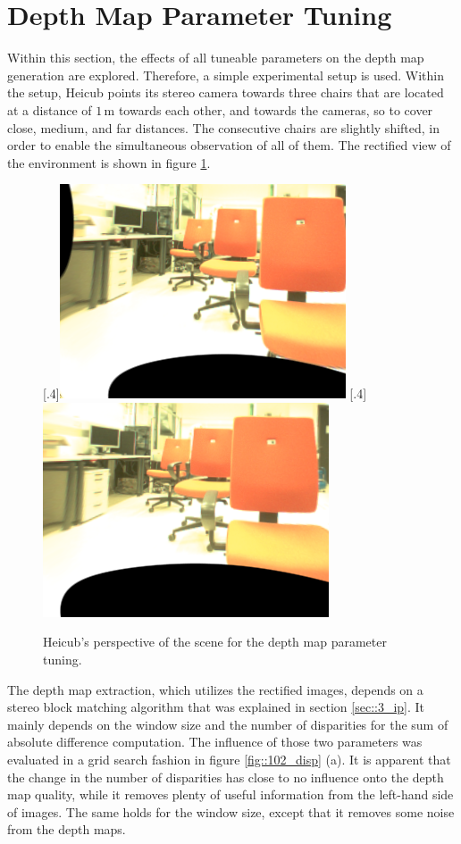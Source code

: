 \section{Depth Map Parameter Tuning}
\label{sec::102_dp}
Within this section, the effects of all tuneable parameters on the depth map generation are explored. Therefore, a simple experimental setup is used. Within the setup, Heicub points its stereo camera towards three chairs that are located at a distance of $1\,\text{m}$ towards each other, and towards the cameras, so to cover close, medium, and far distances. The consecutive chairs are slightly shifted, in order to enable the simultaneous observation of all of them. The rectified view of the environment is shown in figure \ref{fig::102_wls_rgb}.
\begin{figure}[h!]
	\centering
	[.4\linewidth]{\includegraphics[scale=.3]{chapters/10_image_processing_experiments/img/l_rgb.png}}
	[.4\linewidth]{\includegraphics[scale=.3]{chapters/10_image_processing_experiments/img/r_rgb.png}}
	\caption{Heicub's perspective of the scene for the depth map parameter tuning.}
	\label{fig::102_wls_rgb}
\end{figure}
The depth map extraction, which utilizes the rectified images, depends on a stereo block matching algorithm that was explained in section \ref{sec::3_ip}. It mainly depends on the window size and the number of disparities for the sum of absolute difference computation. The influence of those two parameters was evaluated in a grid search fashion in figure \ref{fig::102_disp} (a). It is apparent that the change in the number of disparities has close to no influence onto the depth map quality, while it removes plenty of useful information from the left-hand side of images. The same holds for the window size, except that it removes some noise from the depth maps.

